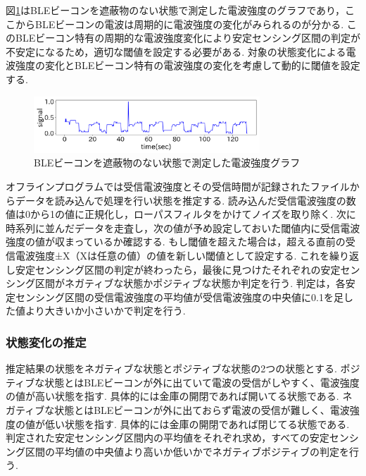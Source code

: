 \documentclass[Japanese]{dicomopapers}
\begin{document}
図\ref{nomal-data}はBLEビーコンを遮蔽物のない状態で測定した電波強度のグラフであり，ここからBLEビーコンの電波は周期的に電波強度の変化がみられるのが分かる.
このBLEビーコン特有の周期的な電波強度変化により安定センシング区間の判定が不安定になるため，適切な閾値を設定する必要がある.
対象の状態変化による電波強度の変化とBLEビーコン特有の電波強度の変化を考慮して動的に閾値を設定する.


\begin{figure}[tbh]
    \centering
    \includegraphics[width=8.5cm]{bokoboko.png}
    \caption{BLEビーコンを遮蔽物のない状態で測定した電波強度グラフ}
    \label{nomal-data}
\end{figure}


オフラインプログラムでは受信電波強度とその受信時間が記録されたファイルからデータを読み込んで処理を行い状態を推定する.
読み込んだ受信電波強度の数値は0から1の値に正規化し，ローパスフィルタをかけてノイズを取り除く.
次に時系列に並んだデータを走査し，次の値が予め設定しておいた閾値内に受信電波強度の値が収まっているか確認する.
もし閾値を超えた場合は，超える直前の受信電波強度±X（Xは任意の値）の値を新しい閾値として設定する.
これを繰り返し安定センシング区間の判定が終わったら，最後に見つけたそれぞれの安定センシング区間がネガティブな状態かポジティブな状態か判定を行う.
判定は，各安定センシング区間の受信電波強度の平均値が受信電波強度の中央値に0.1を足した値より大きいか小さいかで判定を行う.





\subsubsection{状態変化の推定}
推定結果の状態をネガティブな状態とポジティブな状態の2つの状態とする.
ポジティブな状態とはBLEビーコンが外に出ていて電波の受信がしやすく、電波強度の値が高い状態を指す. 具体的には金庫の開閉であれば開いてる状態である.
ネガティブな状態とはBLEビーコンが外に出ておらず電波の受信が難しく、電波強度の値が低い状態を指す. 具体的には金庫の開閉であれば閉じてる状態である.
判定された安定センシング区間内の平均値をそれぞれ求め，すべての安定センシング区間の平均値の中央値より高いか低いかでネガティブポジティブの判定を行う.
\end{document}
